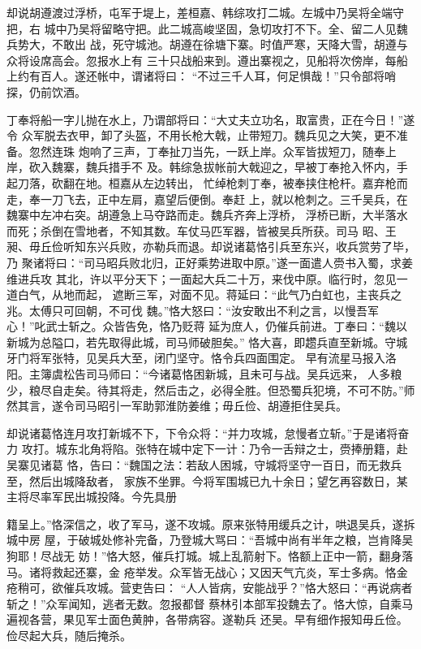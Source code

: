 却说胡遵渡过浮桥，屯军于堤上，差桓嘉、韩综攻打二城。左城中乃吴将全端守把，右
城中乃吴将留略守把。此二城高峻坚固，急切攻打不下。全、留二人见魏兵势大，不敢出
战，死守城池。胡遵在徐塘下寨。时值严寒，天降大雪，胡遵与众将设席高会。忽报水上有
三十只战船来到。遵出寨视之，见船将次傍岸，每船上约有百人。遂还帐中，谓诸将曰：
“不过三千人耳，何足惧哉！”只令部将哨探，仍前饮酒。

丁奉将船一字儿抛在水上，乃谓部将曰：“大丈夫立功名，取富贵，正在今日！”遂令
众军脱去衣甲，卸了头盔，不用长枪大戟，止带短刀。魏兵见之大笑，更不准备。忽然连珠
炮响了三声，丁奉扯刀当先，一跃上岸。众军皆拔短刀，随奉上岸，砍入魏寨，魏兵措手不
及。韩综急拔帐前大戟迎之，早被丁奉抢入怀内，手起刀落，砍翻在地。桓嘉从左边转出，
忙绰枪刺丁奉，被奉挟住枪杆。嘉弃枪而走，奉一刀飞去，正中左肩，嘉望后便倒。奉赶
上，就以枪刺之。三千吴兵，在魏寨中左冲右突。胡遵急上马夺路而走。魏兵齐奔上浮桥，
浮桥已断，大半落水而死；杀倒在雪地者，不知其数。车仗马匹军器，皆被吴兵所获。司马
昭、王昶、毋丘俭听知东兴兵败，亦勒兵而退。却说诸葛恪引兵至东兴，收兵赏劳了毕，乃
聚诸将曰：“司马昭兵败北归，正好乘势进取中原。”遂一面遣人赍书入蜀，求姜维进兵攻
其北，许以平分天下；一面起大兵二十万，来伐中原。临行时，忽见一道白气，从地而起，
遮断三军，对面不见。蒋延曰：“此气乃白虹也，主丧兵之兆。太傅只可回朝，不可伐
魏。”恪大怒曰：“汝安敢出不利之言，以慢吾军心！”叱武士斩之。众皆告免，恪乃贬蒋
延为庶人，仍催兵前进。丁奉曰：“魏以新城为总隘口，若先取得此城，司马师破胆矣。”
恪大喜，即趱兵直至新城。守城牙门将军张特，见吴兵大至，闭门坚守。恪令兵四面围定。
早有流星马报入洛阳。主簿虞松告司马师曰：“今诸葛恪困新城，且未可与战。吴兵远来，
人多粮少，粮尽自走矣。待其将走，然后击之，必得全胜。但恐蜀兵犯境，不可不防。”师
然其言，遂令司马昭引一军助郭淮防姜维；毋丘俭、胡遵拒住吴兵。

却说诸葛恪连月攻打新城不下，下令众将：“并力攻城，怠慢者立斩。”于是诸将奋力
攻打。城东北角将陷。张特在城中定下一计：乃令一舌辩之士，赍捧册籍，赴吴寨见诸葛
恪，告曰：“魏国之法：若敌人困城，守城将坚守一百日，而无救兵至，然后出城降敌者，
家族不坐罪。今将军围城已九十余日；望乞再容数日，某主将尽率军民出城投降。今先具册

籍呈上。”恪深信之，收了军马，遂不攻城。原来张特用缓兵之计，哄退吴兵，遂拆城中房
屋，于破城处修补完备，乃登城大骂曰：“吾城中尚有半年之粮，岂肯降吴狗耶！尽战无
妨！”恪大怒，催兵打城。城上乱箭射下。恪额上正中一箭，翻身落马。诸将救起还寨，金
疮举发。众军皆无战心；又因天气亢炎，军士多病。恪金疮稍可，欲催兵攻城。营吏告曰：
“人人皆病，安能战乎？”恪大怒曰：“再说病者斩之！”众军闻知，逃者无数。忽报都督
蔡林引本部军投魏去了。恪大惊，自乘马遍视各营，果见军士面色黄肿，各带病容。遂勒兵
还吴。早有细作报知毋丘俭。俭尽起大兵，随后掩杀。

